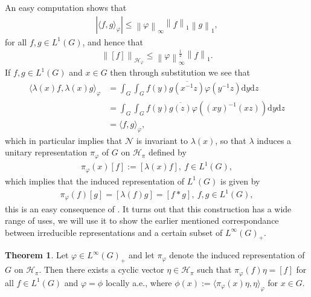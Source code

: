 \documentclass[10pt,twoside,openany,final]{memoir}
\theoremstyle{definition}
\newtheorem{theorem}{Theorem}[chapter]
\theoremstyle{Break}
\newcommand{\lv}{\left\lVert}
\newcommand{\rv}{\right\rVert}
\renewcommand{\H}{\mathcal{H}}
\renewcommand{\d}{\mathrm{d}}
\begin{document}
An easy computation shows that
\begin{align}
	| \langle f,g\rangle_\varphi| \leq \lv \varphi \rv_{\infty} \lv f\rv_1 \lv g \rv_1,
	\label{3.18}
\end{align}
for all $f,g \in L^1(G)$, and hence that
\begin{align*}
	\lv [f] \rv_{\H_\varphi} \leq \lv \varphi \rv_{\infty}^{\frac{1}{2}}\lv f \rv_1.
\end{align*}
If $f, g \in L^1(G)$ and $x \in G$ then through substitution we see that
\begin{align*}
	\langle \lambda(x) f, \lambda(x) g \rangle_\varphi &= \int_G \int_G f(y) \overline{g(x^{-1}z)} \varphi(y^{-1}z) \d y \d z
	\\&=\int_G \int_G f(y) \overline{g(z)} \varphi\left( (xy)^{-1}(xz) \right) \d y \d z\\
	&= \langle f,g \rangle_\varphi,
\end{align*}
which in particular implies that $\mathcal{N}$ is invariant to $\lambda(x)$, so that $\lambda$ induces a unitary representation $\pi_\varphi$ of $G$ on $\H_\pi$ defined by
\begin{align}
	\pi_\varphi(x) [f]:=[\lambda(x) f], \ f \in L^1(G),
	\label{3.19}
\end{align}
which implies that the induced representation of $L^1(G)$ is given by
\begin{align*}
	\pi_\varphi(f)[g]=[\lambda(f)g ]=[f \ast g], \ f,g \in L^1(G),
\end{align*}
this is an easy consequence of . It turns out that this construction has a wide range of uses, we will use it to show the earlier mentioned correspondance between irreducible representations and a certain subset of $L^\infty(G)_+$. 
\begin{theorem}
	Let $\varphi\in L^\infty(G)_+$ and let $\pi_\varphi$ denote the induced representation of $G$ on $\H_\pi$. Then there exists a cyclic vector $\eta\in \H_\pi$ such that $\pi_\varphi(f) \eta = [f]$ for all $f \in L^1(G)$ and $\varphi=\phi$ locally a.e., where $\phi(x):=\langle \pi_\varphi(x) \eta,\eta\rangle_ \varphi$ for $x \in G$.
	\label{3.20}
\end{theorem}
\end{document}
